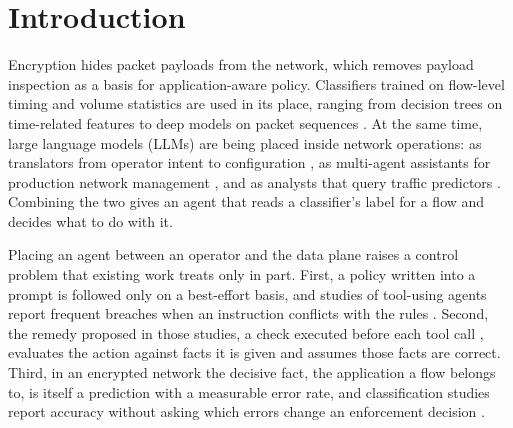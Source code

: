 \documentclass[conference,a4paper]{IEEEtran}
\begin{document}
\section{Introduction}

Encryption hides packet payloads from the network, which removes payload inspection as a basis for application-aware policy. Classifiers trained on flow-level timing and volume statistics are used in its place, ranging from decision trees on time-related features \cite{drapergil2016} to deep models on packet sequences \cite{rezaei2019,lotfollahi2020,elshewey2025}. At the same time, large language models (LLMs) are being placed inside network operations: as translators from operator intent to configuration \cite{wang2024netconfeval}, as multi-agent assistants for production network management \cite{wang2025confucius}, and as analysts that query traffic predictors \cite{adanza2026}. Combining the two gives an agent that reads a classifier's label for a flow and decides what to do with it.

Placing an agent between an operator and the data plane raises a control problem that existing work treats only in part. First, a policy written into a prompt is followed only on a best-effort basis, and studies of tool-using agents report frequent breaches when an instruction conflicts with the rules \cite{zwerdling2025,sah2026verifier}. Second, the remedy proposed in those studies, a check executed before each tool call \cite{zwerdling2025,wang2026agentspec}, evaluates the action against facts it is given and assumes those facts are correct. Third, in an encrypted network the decisive fact, the application a flow belongs to, is itself a prediction with a measurable error rate, and classification studies report accuracy without asking which errors change an enforcement decision \cite{drapergil2016,elshewey2025}.
\end{document}
